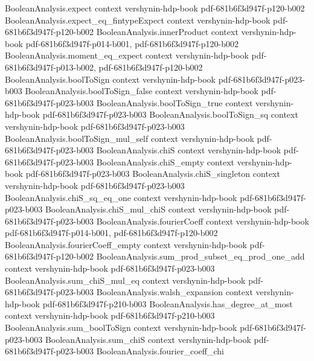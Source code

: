 \begin{theorem}
  {BooleanAnalysis.expect}
  {context}
  {vershynin-hdp-book}
  {pdf-681b6f3d947f-p120-b002}
\proofstep
  {BooleanAnalysis.expect_eq_fintypeExpect}
  {context}
  {vershynin-hdp-book}
  {pdf-681b6f3d947f-p120-b002}
\proofstep
  {BooleanAnalysis.innerProduct}
  {context}
  {vershynin-hdp-book}
  {pdf-681b6f3d947f-p014-b001,
    pdf-681b6f3d947f-p120-b002}
\proofstep
  {BooleanAnalysis.moment_eq_expect}
  {context}
  {vershynin-hdp-book}
  {pdf-681b6f3d947f-p013-b002,
    pdf-681b6f3d947f-p120-b002}
\proofstep
  {BooleanAnalysis.boolToSign}
  {context}
  {vershynin-hdp-book}
  {pdf-681b6f3d947f-p023-b003}
\proofstep
  {BooleanAnalysis.boolToSign_false}
  {context}
  {vershynin-hdp-book}
  {pdf-681b6f3d947f-p023-b003}
\proofstep
  {BooleanAnalysis.boolToSign_true}
  {context}
  {vershynin-hdp-book}
  {pdf-681b6f3d947f-p023-b003}
\proofstep
  {BooleanAnalysis.boolToSign_sq}
  {context}
  {vershynin-hdp-book}
  {pdf-681b6f3d947f-p023-b003}
\proofstep
  {BooleanAnalysis.boolToSign_mul_self}
  {context}
  {vershynin-hdp-book}
  {pdf-681b6f3d947f-p023-b003}
\proofstep
  {BooleanAnalysis.chiS}
  {context}
  {vershynin-hdp-book}
  {pdf-681b6f3d947f-p023-b003}
\proofstep
  {BooleanAnalysis.chiS_empty}
  {context}
  {vershynin-hdp-book}
  {pdf-681b6f3d947f-p023-b003}
\proofstep
  {BooleanAnalysis.chiS_singleton}
  {context}
  {vershynin-hdp-book}
  {pdf-681b6f3d947f-p023-b003}
\proofstep
  {BooleanAnalysis.chiS_sq_eq_one}
  {context}
  {vershynin-hdp-book}
  {pdf-681b6f3d947f-p023-b003}
\proofstep
  {BooleanAnalysis.chiS_mul_chiS}
  {context}
  {vershynin-hdp-book}
  {pdf-681b6f3d947f-p023-b003}
\proofstep
  {BooleanAnalysis.fourierCoeff}
  {context}
  {vershynin-hdp-book}
  {pdf-681b6f3d947f-p014-b001,
    pdf-681b6f3d947f-p120-b002}
\proofstep
  {BooleanAnalysis.fourierCoeff_empty}
  {context}
  {vershynin-hdp-book}
  {pdf-681b6f3d947f-p120-b002}
\proofstep
  {BooleanAnalysis.sum_prod_subset_eq_prod_one_add}
  {context}
  {vershynin-hdp-book}
  {pdf-681b6f3d947f-p023-b003}
\proofstep
  {BooleanAnalysis.sum_chiS_mul_eq}
  {context}
  {vershynin-hdp-book}
  {pdf-681b6f3d947f-p023-b003}
\proofstep
  {BooleanAnalysis.walsh_expansion}
  {context}
  {vershynin-hdp-book}
  {pdf-681b6f3d947f-p210-b003}
\proofstep
  {BooleanAnalysis.has_degree_at_most}
  {context}
  {vershynin-hdp-book}
  {pdf-681b6f3d947f-p210-b003}
\proofstep
  {BooleanAnalysis.sum_boolToSign}
  {context}
  {vershynin-hdp-book}
  {pdf-681b6f3d947f-p023-b003}
\proofstep
  {BooleanAnalysis.sum_chiS}
  {context}
  {vershynin-hdp-book}
  {pdf-681b6f3d947f-p023-b003}
\proofstep
  {BooleanAnalysis.fourier_coeff_chi}

\end{theorem}
